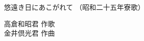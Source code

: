 \documentclass[10pt,b5j]{tarticle} %
\begin{document}
\begin{minipage}[c]{0.7\hsize} %
    \begin{center}
        {\LARGE
            悠遠き日にあこがれて %
        }
        {\small 
            （昭和二十五年寮歌） %
        }
    \end{center}
\end{minipage}
\begin{minipage}[c]{0.3\hsize} %
    \begin{flushright} %
        高倉和昭君 作歌\\金井倶光君 作曲 %
    \end{flushright}
\end{minipage}
\end{document}
